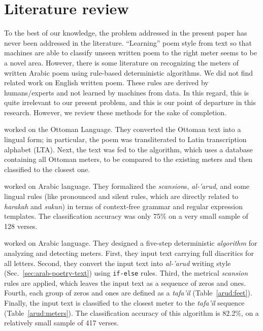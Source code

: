 \section{Literature review}\label{sec:literature-review}
To the best of our knowledge, the problem addressed in the present paper has never been addressed in
the literature. ``Learning'' poem style from text so that machines are able to classify unseen
written poem to the right meter seems to be a novel area. However, there is some literature on
recognizing the meters of written Arabic poem using rule-based deterministic algorithms. We did not
find related work on English written poem. These rules are derived by humans/experts and not learned
by machines from data. In this regard, this is quite irrelevant to our present problem, and this is
our point of departure in this research. However, we review these methods for the sake of
completion.

\cite{Kurt2012AlgorithmForDetectionAnalysis} worked on the Ottoman Language. They converted the
Ottoman text into a lingual form; in particular, the poem was transliterated to Latin transcription
alphabet (LTA). Next, the text was fed to the algorithm, which uses a database containing all
Ottoman meters, to be compared to the existing meters and then classified to the closest one.

\cite{Alnagdawi2013FindingArabicPoemMeter} worked on Arabic language. They formalized the
\textit{scansion}s, \textit{al-'arud}, and some lingual rules (like pronounced and silent rules,
which are directly related to \textit{harakah} and \textit{sukun}) in terms of context-free grammar
and regular expression templates. The classification accuracy was only 75\% on a very small sample
of 128 verses.

\cite{Abuata2016RuleBasedAlgorithmFor} worked on Arabic language. They designed a five-step
deterministic \textit{algorithm} for analyzing and detecting meters. First, they input text carrying
full diacritics for all letters. Second, they convert the input text into \textit{al-'arud} writing
style (Sec.~\ref{sec:arab-poetry-text}) using \texttt{if-else} rules. Third, the metrical
\textit{scansion} rules are applied, which leaves the input text as a sequence of zeros and
ones. Fourth, each group of zeros and ones are defined as a \textit{tafa'il}
(Table~\ref{arud:feet}). Finally, the input text is classified to the closest meter to the
\textit{tafa'il} sequence (Table~\ref{arud:meters}). The classification accuracy of this algorithm
is 82.2\%, on a relatively small sample of 417 verses.

